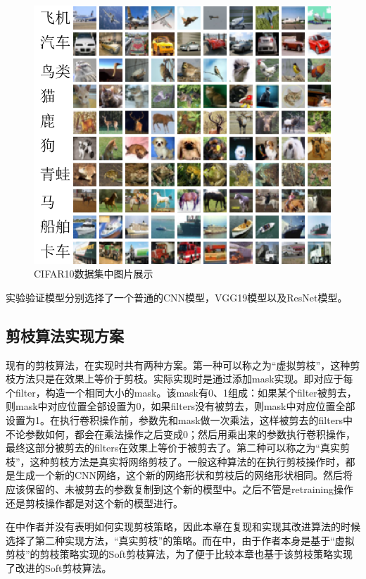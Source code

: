 \documentclass[ pdftex, oneside, master]{NJUthesis}
\begin{document}
\begin{figure}
\centering
\includegraphics[width=\textwidth]{cifar10.png}
\caption{CIFAR10数据集中图片展示}
\label{cifar10_dataset}
\end{figure}

实验验证模型分别选择了一个普通的CNN模型，VGG19模型以及ResNet模型。

\subsection{剪枝算法实现方案}

现有的剪枝算法，在实现时共有两种方案。第一种可以称之为“虚拟剪枝”，这种剪枝方法只是在效果上等价于剪枝。实际实现时是通过添加mask实现。即对应于每个filter，构造一个相同大小的mask。该mask有0、1组成：如果某个filter被剪去，则mask中对应位置全部设置为0，如果filters没有被剪去，则mask中对应位置全部设置为1。在执行卷积操作前，参数先和mask做一次乘法，这样被剪去的filters中不论参数如何，都会在乘法操作之后变成0；然后用乘出来的参数执行卷积操作，最终这部分被剪去的filters在效果上等价于被剪去了。第二种可以称之为“真实剪枝”，这种剪枝方法是真实将网络剪枝了。一般这种算法的在执行剪枝操作时，都是生成一个新的CNN网络，这个新的网络形状和剪枝后的网络形状相同。然后将应该保留的、未被剪去的参数复制到这个新的模型中。之后不管是retraining操作还是剪枝操作都是对这个新的模型进行。

在\cite{17}中作者并没有表明如何实现剪枝策略，因此本章在复现\cite{17}和实现其改进算法的时候选择了第二种实现方法，“真实剪枝”的策略。而在\cite{27}中，由于作者本身是基于“虚拟剪枝”的剪枝策略实现的Soft剪枝算法，为了便于比较本章也基于该剪枝策略实现了改进的Soft剪枝算法。
\end{document}
